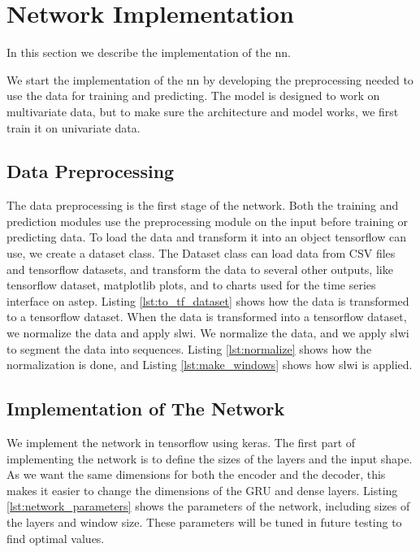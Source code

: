 \section{Network Implementation}
In this section we describe the implementation of the \gls{nn}.

We start the implementation of the \gls{nn} by developing the preprocessing needed to use the data for training and predicting. The model is designed to work on multivariate data, but to make sure the architecture and model works, we first train it on univariate data.



\subsection{Data Preprocessing}
The data preprocessing is the first stage of the network. Both the training and prediction modules use the preprocessing module on the input before training or predicting data. To load the data and transform it into an object \gls{tensorflow} can use, we create a dataset class. The Dataset class can load data from CSV files and \gls{tensorflow} datasets, and transform the data to several other outputs, like \gls{tensorflow} dataset, matplotlib plots, and to charts used for the time series interface on \gls{astep}. Listing \ref{lst:to_tf_dataset} shows how the data is transformed to a \gls{tensorflow} dataset. When the data is transformed into a \gls{tensorflow} dataset, we normalize the data and apply \gls{slwi}. We normalize the data, and we apply \gls{slwi} to segment the data into sequences. Listing \ref{lst:normalize} shows how the normalization is done, and Listing \ref{lst:make_windows} shows how \gls{slwi} is applied.








\subsection{Implementation of The Network}
We implement the network in \gls{tensorflow} using \gls{keras}. The first part of implementing the network is to define the sizes of the layers and the input shape. As we want the same dimensions for both the encoder and the decoder, this makes it easier to change the dimensions of the GRU and dense layers. Listing \ref{lst:network_parameters} shows the parameters of the network, including sizes of the layers and window size. These parameters will be tuned in future testing to find optimal values.

